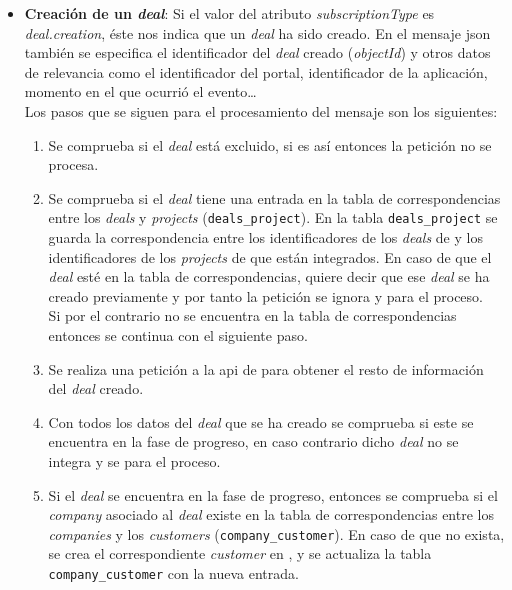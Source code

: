 \begin{itemize}
	\item \textbf{Creación de un \textit{deal}}: Si el valor del atributo \textit{subscriptionType} es \textit{deal.creation}, éste nos indica que un \textit{deal} ha sido creado.
		En el mensaje \acrshort{json} también se especifica el identificador del \textit{deal} creado (\textit{objectId}) y otros datos de relevancia como el identificador del portal, identificador de la aplicación, momento en el que ocurrió el evento\ldots \\
	
		
		Los pasos que se siguen para el procesamiento del mensaje son los siguientes:
		
		\begin{enumerate}
			\item Se comprueba si el \textit{deal} está excluido, si es así entonces la petición no se procesa.
		
			\item Se comprueba si el \textit{deal} tiene una entrada en la tabla de correspondencias entre los \textit{deals} y \textit{projects} (\texttt{deals\_project}).
		En la tabla \texttt{deals\_project} se guarda la correspondencia entre los identificadores de los \textit{deals} de \hs{} y los identificadores de los \textit{projects} de \wday{} que están integrados.
		En caso de que el \textit{deal} esté en la tabla de correspondencias, quiere decir que ese \textit{deal} se ha creado previamente y por tanto la petición se ignora y para el proceso.\\
		
		Si por el contrario no se encuentra en la tabla de correspondencias entonces se continua con el siguiente paso.
		
			\item Se realiza una petición a la \acrshort{api} de \hs{} para obtener el resto de información del \textit{deal} creado.
			\item Con todos los datos del \textit{deal} que se ha creado se comprueba si este se encuentra en la fase de progreso, en caso contrario dicho \textit{deal} no se integra y se para el proceso.
			\item Si el \textit{deal} se encuentra en la fase de progreso, entonces se comprueba si el \textit{company} asociado al \textit{deal} existe en la tabla de correspondencias entre los \textit{companies} y los \textit{customers} (\texttt{company\_customer}).
			En caso de que no exista, se crea el correspondiente \textit{customer} en \wday{}, y se actualiza la tabla \texttt{company\_customer} con la nueva entrada.
			

\end{enumerate}
\end{itemize}
